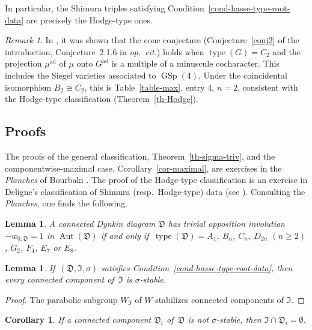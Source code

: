\documentclass[11pt]{amsart}
\numberwithin{equation}{section}
\newtheorem{lemma}[theorem]{Lemma}
\newtheorem{corollary}[theorem]{Corollary}
\theoremstyle{definition}
\theoremstyle{remark}
\newtheorem{rmk}[theorem]{Remark}
\newcommand{\Dfr}{{\mathfrak D}}
\newcommand{\Ifr}{{\mathfrak I}}
\DeclareMathOperator{\ad}{ad}
\DeclareMathOperator{\GSp}{GSp}
\newcommand{\opcitn}{{\em op.\ cit.}}
\DeclareMathOperator{\type}{type}
\DeclareMathOperator{\Aut}{Aut}
\begin{document}
In particular, the Shimura triples satisfying Condition~\ref{cond-hasse-type-root-data} are precisely the Hodge-type ones.

\begin{rmk}
\label{rmk-Siegel-threefold}
In \cite{Goldring-Koskivirta-global-sections-compositio}, it was shown that the cone conjecture (Conjecture~\ref{conj2} of the introduction, Conjecture~2.1.6 in \opcitn) holds when $\type(G)=C_2$ and the projection $\mu^{\ad}$ of $\mu$ onto $G^{\ad}$ is a multiple of a minuscule cocharacter. This includes the Siegel varieties associated to $\GSp(4)$. Under the coincidental isomorphism $B_2 \cong C_2$, this is Table~\ref{table-max}, entry 4, $n=2$, consistent with the Hodge-type classification (Theorem~\ref{th-Hodge}).
 \end{rmk}

\subsection{Proofs}
\label{sec-app-proofs}
The proofs of the general classification, Theorem~\ref{th-sigma-triv}, and the componentwise-maximal case, Corollary~\ref{cor-maximal}, are exercises in the \textit{Planches} of Bourbaki \cite[Chapitre~6, Planches~I-IX]{bourbaki-lie-4-6}. The proof of the Hodge-type classification is an exercise in Deligne's classification  of Shimura (resp.\ Hodge-type) data (see \cite[\textit{loc.~cit.} and Section~1.2.5]{Deligne-Shimura-varieties}). Consulting the \textit{Planches}, one finds the following. 

\begin{lemma}
\label{lem-opp-inv-triv}
A connected Dynkin diagram $\Dfr$ has trivial opposition involution $-w_{0,\Dfr}=1$ in $\Aut(\Dfr)$ if and only if\, $\type(\Dfr)=A_1$, $B_n$,  $C_n$, 
$D_{2n}$ $(n \geq 2)$, $G_2$, $F_4$, $E_7$ or $E_8$.
\end{lemma}

\begin{lemma}
\label{lem-components}  
If\, $(\Dfr, \Ifr, \sigma)$ satisfies Condition~\ref{cond-hasse-type-root-data}, then every connected component of\, $\Ifr$ is $\sigma$-stable.
\end{lemma}

\begin{proof}
    The parabolic subgroup $W_{\Ifr}$ of $W$ stabilizes connected components of $\Ifr$.
\end{proof}

\begin{corollary}
\label{cor-components}    
If a connected component $\Dfr_i$ of\, $\Dfr$ is not $\sigma$-stable, then $\Ifr \cap \Dfr_i =\emptyset$.
\end{corollary}
\end{document}
